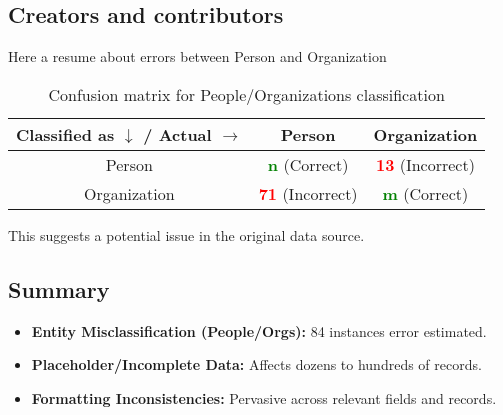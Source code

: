\documentclass[11pt, a4paper]{article}
\begin{document}
\subsection{Creators and contributors}
Here a resume about errors between Person and Organization
\begin{table}[h]
    \centering
    \begin{tabular}{|c|c|c|}
        \hline
        Classified as $\downarrow$ / Actual $\rightarrow$ & Person & Organization \\
        \hline
        Person &  \textcolor{green}{\textbf{n}} (Correct) & \textcolor{red}{\textbf{13}} (Incorrect) \\
        \hline
        Organization & \textcolor{red}{\textbf{71}} (Incorrect) &  \textcolor{green}{\textbf{m}} (Correct) \\
        \hline
    \end{tabular}
    \caption{Confusion matrix for People/Organizations classification}
    \label{tab:people_org}
\end{table}
\newline
This suggests a potential issue in the original data source.





\subsection{Summary}
\begin{itemize}
    \item \textbf{Entity Misclassification (People/Orgs):} 84 instances error estimated.
    \item \textbf{Placeholder/Incomplete Data:} Affects dozens to hundreds of records.
    \item \textbf{Formatting Inconsistencies:} Pervasive across relevant fields and records.
\end{itemize}
\end{document}
